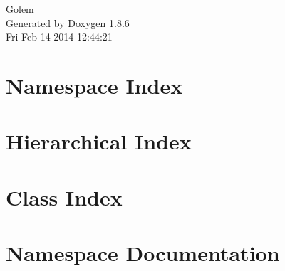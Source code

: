 \documentclass[twoside]{book}
\newcommand{\clearemptydoublepage}{%
  \newpage{\pagestyle{empty}\cleardoublepage}%
}
\begin{document}
\hypersetup{pageanchor=false}
\begin{titlepage}
\vspace*{7cm}
\begin{center}%
{\Large Golem }\\
\vspace*{1cm}
{\large Generated by Doxygen 1.8.6}\\
\vspace*{0.5cm}
{\small Fri Feb 14 2014 12:44:21}\\
\end{center}
\end{titlepage}
\clearemptydoublepage
\tableofcontents
\clearemptydoublepage
{}
\hypersetup{pageanchor=true}

\chapter{Namespace Index}

\chapter{Hierarchical Index}

\chapter{Class Index}

\chapter{Namespace Documentation}





















\end{document}
